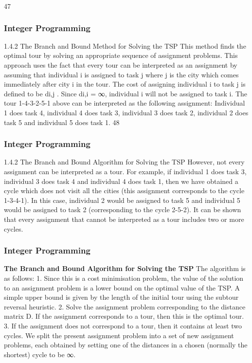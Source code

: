 \begin{frame}
47 \end{frame}  \begin{frame} \frametitle{Integer Programming}     
1.4.2 The Branch and Bound Method for Solving the TSP
This method finds the optimal tour by solving an appropriate
sequence of assignment problems.
This approach uses the fact that every tour can be interpreted as
an assignment by assuming that individual i is assigned to task j
where j is the city which comes immediately after city i in the tour.
The cost of assigning individual i to task j is defined to be di,j
.
Since di,i = ∞, individual i will not be assigned to task i.
The tour 1-4-3-2-5-1 above can be interpreted as the following
assignment: Individual 1 does task 4, individual 4 does task 3,
individual 3 does task 2, individual 2 does task 5 and individual 5
does task 1.
48 
\end{frame}  
\begin{frame}
\frametitle{Integer Programming}     
1.4.2 The Branch and Bound Algorithm for Solving the
TSP
However, not every assignment can be interpreted as a tour. For
example, if individual 1 does task 3, individual 3 does task 4 and
individual 4 does task 1, then we have obtained a cycle which does
not visit all the cities (this assignment corresponds to the cycle
1-3-4-1).
In this case, individual 2 would be assigned to task 5 and individual
5 would be assigned to task 2 (corresponding to the cycle 2-5-2).
It can be shown that every assignment that cannot be interpreted
as a tour includes two or more cycles.
\end{frame}  
\begin{frame} 
\frametitle{Integer Programming}     
\noindent \textbf{
The Branch and Bound Algorithm for Solving the TSP}
The algorithm is as follows:
1. Since this is a cost minimisation problem, the value
of the solution to an assignment problem is a lower
bound on the optimal value of the TSP. A simple
upper bound is given by the length of the initial tour
using the subtour reversal heuristic.
2. Solve the assignment problem corresponding to the
distance matrix D. If the assignment corresponds to
a tour, then this is the optimal tour.
3. If the assignment does not correspond to a tour, then
it contains at least two cycles. We split the present
assignment problem into a set of new assignment
problems, each obtained by setting one of the
distances in a chosen (normally the shortest) cycle to
be ∞.
\end{frame}  
